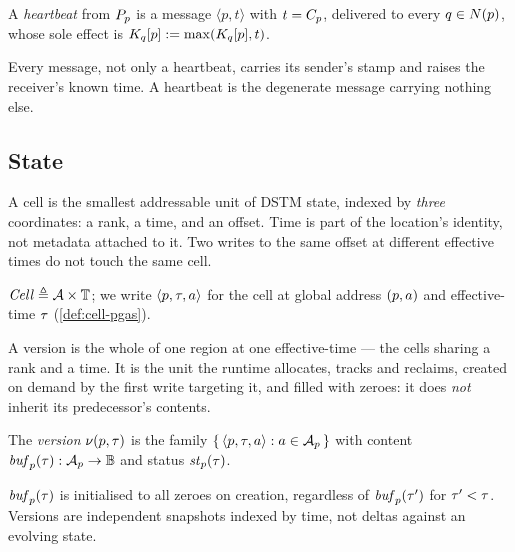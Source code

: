 \begin{definition}[Heartbeat]\label{def:heartbeat}
A \emph{heartbeat} from $P_{p}$ is a message $\langle p, t\rangle$ with
$t = C_{p}$, delivered to every $q \in N(p)$, whose sole effect is
$K_{q}[p] \mathrel{{:}{=}} \max(K_{q}[p], t)$.
\end{definition}

Every message, not only a heartbeat, carries its sender's stamp and raises the
receiver's known time. A heartbeat is the degenerate message carrying nothing
else.

\subsection{State}
\label{sec:gloss-state}

A cell is the smallest addressable unit of DSTM state, indexed by
\emph{three} coordinates: a rank, a time, and an offset. Time is part of the
location's identity, not metadata attached to it. Two writes to the same
offset at different effective times do not touch the same cell.

\begin{definition}[Cell]\label{def:cell}
$\mathit{Cell} \triangleq \mathcal{A} \times \mathbb{T}$; we write $\langle p, \tau, a\rangle$ for the cell
at global address $(p,a)$ and \gls{effective-time} $\tau$
(\cref{def:cell-pgas}).
\end{definition}

A version is the whole of one region at one \gls{effective-time} --- the cells
sharing a rank and a time. It is the unit the runtime allocates, tracks and
reclaims, created on demand by the first write targeting it, and filled with
zeroes: it does \emph{not} inherit its predecessor's contents.

\begin{definition}[Version]\label{def:version}
The \emph{version} $\nu(p,\tau)$ is the family
$\{\, \langle p, \tau, a\rangle : a \in \mathcal{A}_{p} \,\}$ with content
$\mathit{buf}_{p}(\tau) : \mathcal{A}_{p} \to \mathbb{B}$ and status $\mathit{st}_{p}(\tau)$.
\end{definition}

\begin{convention}
\label{conv:no-inherit}
$\mathit{buf}_{p}(\tau)$ is initialised to all zeroes on creation, regardless of
$\mathit{buf}_{p}(\tau')$ for $\tau' < \tau$. Versions are independent snapshots
indexed by time, not deltas against an evolving state.
\end{convention}


